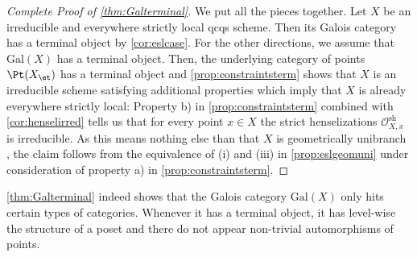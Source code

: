 \documentclass[leqno]{article}
\renewcommand{\Gal}{\mathrm{Gal}}
\begin{document}
%
\begin{proof}[Complete Proof of \cref{thm:Galterminal}] We put all the pieces together. 
Let $X$ be an irreducible and everywhere strictly local qcqs scheme.
Then its Galois category has a terminal object by \cref{cor:eslcase}.
For the other directions, we assume that $\Gal(X)$ has a terminal object.
Then, the underlying category of points $\Pt(X_{\et})$ has a terminal object and \cref{prop:constraintsterm} shows that $X$ is an irreducible scheme satisfying additional properties which imply that $X$ is already everywhere strictly local:
Property b) in \cref{prop:constraintsterm} combined with \cref{cor:henselirred} tells us that for every point $x\in X$ the strict henselizations $\mathcal{O}_{X,x}^{\mathrm{sh}}$ is irreducible.
As this means nothing else than that $X$ is geometrically unibranch \cite[\href{https://stacks.math.columbia.edu/tag/06DM }{Tag 06DM}]{stacksproject}, the claim follows from the equivalence of (i) and (iii) in \cref{prop:eslgeomuni} under consideration of property a) in \cref{prop:constraintsterm}.
\end{proof}
\begin{remark}
\cref{thm:Galterminal} indeed shows that the Galois category $\Gal(X)$ only hits certain types of categories.
Whenever it has a terminal object, it has level-wise the structure of a poset and there do not appear non-trivial automorphisms of points.
\end{remark}
%
\end{document}

